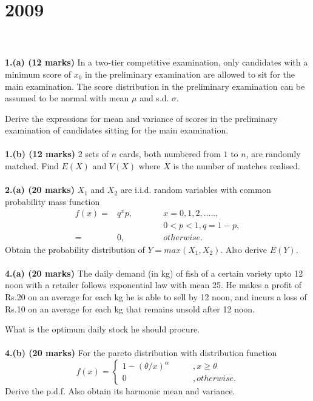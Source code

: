 \section*{2009}
\vspace{-.5cm}
\hrulefill \\\\
\textbf{1.(a) (12 marks)} In a two-tier competitive examination, only candidates with a minimum score of $x_0$ in the preliminary examination are allowed to sit for the main examination. The score distribution in the preliminary examination can be assumed to be normal with mean $\mu$ and s.d. $\sigma$. \vspace{.05cm}

Derive the expressions for mean and variance of scores in the preliminary examination of candidates sitting for the main examination. 
\\\\
\textbf{1.(b) (12 marks)} 2 sets of $n$ cards, both numbered from $1$ to $n$, are randomly matched. Find \(E(X)\) and \(V(X)\) where \(X\) is the number of matches realised.
\\\\
\textbf{2.(a) (20 marks)} $X_1$ and $X_2$ are i.i.d. random variables with common probability mass function
\begin{equation*}
\begin{aligned}
    f(x) = &q^x p, \qquad &&x = 0,1,2, .....  ,\\
           &        &&0 < p < 1, q = 1 - p,\\
         = &0,      &&otherwise.
\end{aligned}
\end{equation*}
Obtain the probability distribution of \( Y = max(X_1, X_2)\). Also derive $E(Y)$.
\\\\
\textbf{4.(a) (20 marks)} The daily demand (in kg) of fish of a certain variety upto 12 noon with a retailer follows exponential law with mean 25. He makes a profit of Rs.20 on an average for each kg he is able to sell by 12 noon, and incurs a loss of Rs.10 on an average for each kg that remains unsold after 12 noon.\vspace{.05cm}

What is the optimum daily stock he should procure.
\\\\
\textbf{4.(b) (20 marks)} For the pareto distribution with distribution function
\begin{equation*}
    f(x) = \begin{cases}
    1 - (\theta / x)^\alpha \qquad&, x \geq \theta\\
    0 &, otherwise.
    \end{cases}
\end{equation*}
Derive the p.d.f. Also obtain its harmonic mean and variance.\\



